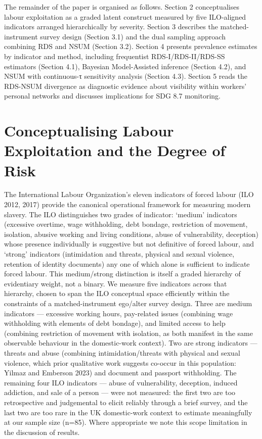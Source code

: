 \documentclass[
  12pt,
  letterpaper,
  DIV=11,
  numbers=noendperiod]{scrartcl}
\begin{document}
The remainder of the paper is organised as follows. Section 2
conceptualises labour exploitation as a graded latent construct measured
by five ILO-aligned indicators arranged hierarchically by severity.
Section 3 describes the matched-instrument survey design (Section 3.1)
and the dual sampling approach combining RDS and NSUM (Section 3.2).
Section 4 presents prevalence estimates by indicator and method,
including frequentist RDS-I/RDS-II/RDS-SS estimators (Section 4.1),
Bayesian Model-Assisted inference (Section 4.2), and NSUM with
continuous-τ sensitivity analysis (Section 4.3). Section 5 reads the
RDS-NSUM divergence as diagnostic evidence about visibility within
workers' personal networks and discusses implications for SDG 8.7
monitoring.

\section{Conceptualising Labour Exploitation and the Degree of
Risk}\label{conceptualising-labour-exploitation-and-the-degree-of-risk}

The International Labour Organization's eleven indicators of forced
labour (ILO 2012, 2017) provide the canonical operational framework for
measuring modern slavery. The ILO distinguishes two grades of indicator:
`medium' indicators (excessive overtime, wage withholding, debt bondage,
restriction of movement, isolation, abusive working and living
conditions, abuse of vulnerability, deception) whose presence
individually is suggestive but not definitive of forced labour, and
`strong' indicators (intimidation and threats, physical and sexual
violence, retention of identity documents) any one of which alone is
sufficient to indicate forced labour. This medium/strong distinction is
itself a graded hierarchy of evidentiary weight, not a binary. We
measure five indicators across that hierarchy, chosen to span the ILO
conceptual space efficiently within the constraints of a
matched-instrument ego/alter survey design. Three are medium indicators
--- excessive working hours, pay-related issues (combining wage
withholding with elements of debt bondage), and limited access to help
(combining restriction of movement with isolation, as both manifest in
the same observable behaviour in the domestic-work context). Two are
strong indicators --- threats and abuse (combining intimidation/threats
with physical and sexual violence, which prior qualitative work suggests
co-occur in this population: Yilmaz and Emberson 2023) and document and
passport withholding. The remaining four ILO indicators --- abuse of
vulnerability, deception, induced addiction, and sale of a person ---
were not measured: the first two are too retrospective and judgemental
to elicit reliably through a brief survey, and the last two are too rare
in the UK domestic-work context to estimate meaningfully at our sample
size (n=85). Where appropriate we note this scope limitation in the
discussion of results.
\end{document}
